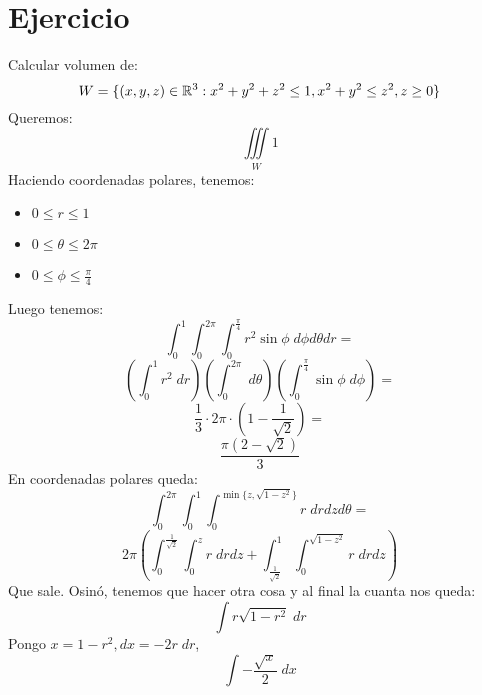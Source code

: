 \documentclass{article}
\begin{document}
    \section*{Ejercicio}
    Calcular volumen de:
    \[W = \{(x,y,z) \in \mathbb{R}^3 : x^2 + y^2 + z^2 \leq 1, x^2 + y^2 \leq z^2, z \geq 0\}\]
    Queremos:
    \[
        \iiint\limits_W 1
    \]
    Haciendo coordenadas polares, tenemos:
    \begin{itemize}
        \item $0 \leq r \leq 1$
        \item $0 \leq \theta \leq 2\pi$
        \item $0 \leq \phi \leq \frac{\pi}{4}$
    \end{itemize}
    Luego tenemos:
    \[
        \int_0^1\int_0^{2\pi}\int_0^{\frac{\pi}{4}} r^2 \sin \phi\; d\phi d\theta dr =
    \]
    \[
        \left(\int_0^1 r^2 \; dr\right) \left(\int_0^{2\pi} \; d\theta\right) \left(\int_0^{\frac{\pi}{4}} \sin \phi \; d\phi\right) =
    \]
    \[
        \frac{1}{3} \cdot 2\pi \cdot \left(1 - \frac{1}{\sqrt 2}\right) =
    \]
    \[
        \frac{\pi\left(2 - \sqrt 2\right)}{3}
    \]
    En coordenadas polares queda:
    \[
        \int_0^{2\pi} \int_0^1 \int_0^{\min \{z, \sqrt{1 - z^2}\}} r \; drdzd\theta =
    \]
    \[
        2\pi\left(
            \int_0^{\frac{1}{\sqrt 2}} \int_0^z r \; drdz +
            \int_{\frac{1}{\sqrt 2}}^1 \int_0^{\sqrt{1 - z^2}} r \; drdz
        \right)
    \]
    Que sale.
    Osinó, tenemos que hacer otra cosa y al final la cuanta nos queda:
    \[
        \int r \sqrt{1 - r^2} \; dr
    \]
    Pongo $x = 1 - r^2, dx = -2r \; dr$,
    \[
        \int -\frac{\sqrt{x}}{2} \; dx
    \]
\end{document}
